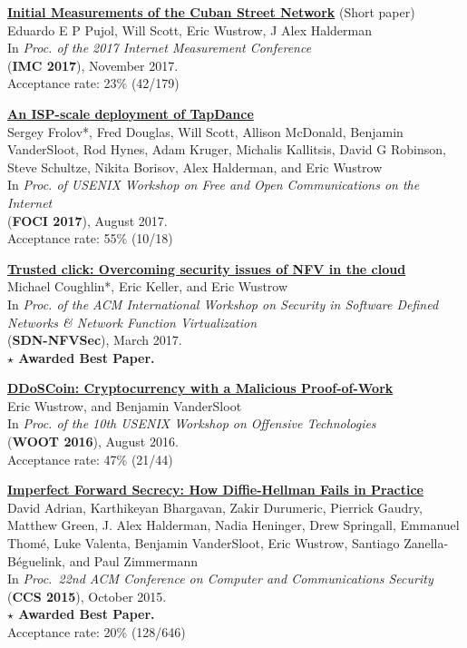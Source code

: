 \documentclass[margin,11pt]{res} %
\begin{document}
    \textbf{\href{https://conferences.sigcomm.org/imc/2017/papers/imc17-final186.pdf}{Initial Measurements of the Cuban Street Network}} (Short paper) \\
    Eduardo E P Pujol, Will Scott, Eric Wustrow, J Alex Halderman \\
    In \emph{Proc. of the 2017 Internet Measurement Conference} \\
    (\textbf{IMC 2017}), November 2017. \\
    Acceptance rate: 23\% (42/179)

    \textbf{\href{https://www.usenix.org/system/files/conference/foci17/foci17-paper-frolov_0.pdf}{An ISP-scale deployment of TapDance}} \\
    Sergey Frolov*, Fred Douglas, Will Scott, Allison McDonald, Benjamin VanderSloot, Rod Hynes, Adam Kruger, Michalis Kallitsis, David G Robinson, Steve Schultze, Nikita Borisov, Alex Halderman, and Eric Wustrow \\
    In \emph{Proc. of USENIX Workshop on Free and Open Communications on the Internet} \\
    (\textbf{FOCI 2017}), August 2017. \\
    Acceptance rate: 55\% (10/18)

    \textbf{\href{http://nsr.colorado.edu/coughlin/doc/sdnnfvsec2017.pdf}{Trusted click: Overcoming security issues of NFV in the cloud}} \\
    Michael Coughlin*, Eric Keller, and Eric Wustrow \\
    In \emph{Proc. of the ACM International Workshop on Security in Software Defined Networks \& Network Function Virtualization} \\
    (\textbf{SDN-NFVSec}), March 2017. \\
    \textbf{$\star$ Awarded Best Paper.}

    \textbf{\href{https://github.com/ewust/DDoSCoin}{DDoSCoin: Cryptocurrency with a Malicious Proof-of-Work}} \\
    Eric Wustrow, and Benjamin VanderSloot \\
    In \emph{Proc. of the 10th USENIX Workshop on Offensive Technologies} \\
    (\textbf{WOOT 2016}), August 2016. \\
    Acceptance rate: 47\% (21/44)

    \textbf{\href{https://weakdh.org/}{Imperfect Forward Secrecy: How Diffie-Hellman Fails in Practice}} \\
    David Adrian, Karthikeyan Bhargavan, Zakir Durumeric, Pierrick Gaudry, Matthew Green,
    J. Alex Halderman, Nadia Heninger, Drew Springall, Emmanuel Thom\'e, Luke Valenta,
    Benjamin VanderSloot, Eric Wustrow, Santiago Zanella-B\'eguelink, and Paul Zimmermann \\
    In \emph{Proc.\ 22nd ACM Conference on Computer and Communications Security} \\
    (\textbf{CCS 2015}), October 2015. \\
    \textbf{$\star$ Awarded Best Paper.} \\
    Acceptance rate: 20\% (128/646)
\end{document}
